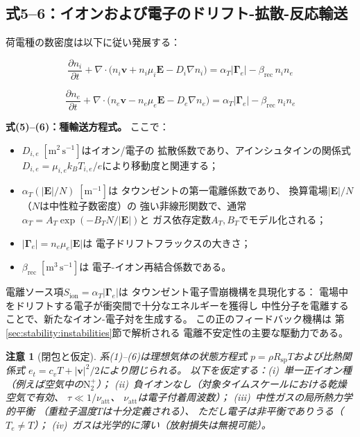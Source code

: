 \documentclass[12pt,twocolumn]{ltjsarticle}
\newtheorem{remark}{注意}
\newcommand{\ee}{\mathbf{E}}
\newcommand{\vv}{\mathbf{v}}
\begin{document}
\subsection{式5--6：イオンおよび電子のドリフト-拡散-反応輸送}
\label{sec:theory:species}

荷電種の数密度は以下に従い発展する：

\begin{equation}
\boxed{
  \frac{\partial n_i}{\partial t}
  + \nabla \cdot \bigl(
    n_i \vv + n_i \mu_i \ee - D_i \nabla n_i
  \bigr)
  = \alpha_T |\bm{\Gamma}_e| - \beta_{\mathrm{rec}}\, n_i n_e
}
\tag{5}
\label{eq:species_ion}
\end{equation}

\begin{equation}
\boxed{
  \frac{\partial n_e}{\partial t}
  + \nabla \cdot \bigl(
    n_e \vv - n_e \mu_e \ee - D_e \nabla n_e
  \bigr)
  = \alpha_T |\bm{\Gamma}_e| - \beta_{\mathrm{rec}}\, n_i n_e
}
\tag{6}
\label{eq:species_electron}
\end{equation}

\noindent
\textbf{式(5)--(6)：種輸送方程式。} ここで：
\begin{itemize}
  \item $D_{i,e}\;[\mathrm{m^2\,s^{-1}}]$はイオン/電子の
    拡散係数であり、アインシュタインの関係式
    $D_{i,e} = \mu_{i,e} k_B T_{i,e} / e$により移動度と関連する；
  \item $\alpha_T(|\ee|/N)\;[\mathrm{m^{-1}}]$は
    タウンゼントの第一電離係数であり、
    換算電場$|\ee|/N$（$N$は中性粒子数密度）の
    強い非線形関数で、通常
    $\alpha_T = A_T \exp(-B_T N / |\ee|)$と
    ガス依存定数$A_T, B_T$でモデル化される\cite{Raizer1991}；
  \item $|\bm{\Gamma}_e| = n_e \mu_e |\ee|$は
    電子ドリフトフラックスの大きさ；
  \item $\beta_{\mathrm{rec}}\;[\mathrm{m^3\,s^{-1}}]$は
    電子-イオン再結合係数である。
\end{itemize}

電離ソース項$S_{\mathrm{ion}} = \alpha_T |\bm{\Gamma}_e|$は
タウンゼント電子雪崩機構を具現化する：
電場中をドリフトする電子が衝突間で十分なエネルギーを獲得し
中性分子を電離することで、新たなイオン-電子対を生成する。
この正のフィードバック機構は
第\ref{sec:stability:instabilities}節で解析される
電離不安定性の主要な駆動力である。

\begin{remark}[閉包と仮定]
\label{rem:closure}
系(1)--(6)は理想気体の状態方程式
$p = \rho R_{\mathrm{sp}} T$および比熱関係式
$e_t = c_v T + |\vv|^2/2$により閉じられる。
以下を仮定する：(i)~単一正イオン種（例えば空気中の$\mathrm{N}_2^+$）；
(ii)~負イオンなし（対象タイムスケールにおける乾燥空気で有効、
$\tau \ll 1/\nu_{\mathrm{att}}$、
$\nu_{\mathrm{att}}$は電子付着周波数）；
(iii)~中性ガスの局所熱力学的平衡
（重粒子温度$T$は十分定義される）、
ただし電子は非平衡でありうる（$T_e \neq T$）；
(iv)~ガスは光学的に薄い（放射損失は無視可能）。
\end{remark}
\end{document}
